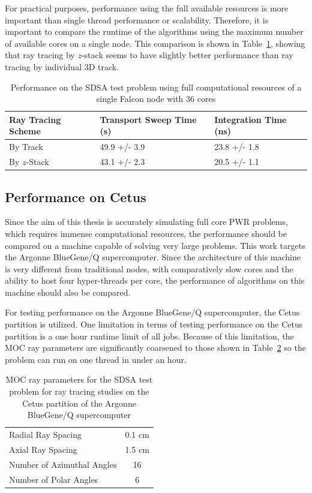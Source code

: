 For practical purposes, performance using the full available resources is more important than single thread performance or scalability. Therefore, it is important to compare the runtime of the algorithms using the maximum number of available cores on a single node. This comparison is shown in Table~\ref{tab:rt-full-thread}, showing that ray tracing by $z$-stack seems to have slightly better performance than ray tracing by individual 3D track.

\begin{table}[ht]
	\centering
	\caption{Performance on the SDSA test problem using full computational resources of a single Falcon node with 36 cores}
	\medskip
	\begin{tabular}{l|l|l}
		\hline
		Ray Tracing Scheme & Transport Sweep Time (s) & Integration Time (ns) \\
		\hline
		By Track & 49.9 +/- 3.9 & 23.8 +/- 1.8 \\
		By $z$-Stack & 43.1 +/- 2.3 & 20.5 +/- 1.1 \\
		\hline
	\end{tabular}
	\label{tab:rt-full-thread}
\end{table}

\subsection{Performance on Cetus}

Since the aim of this thesis is accurately simulating full core PWR problems, which requires immense computational resources, the performance should be compared on a machine capable of solving very large problems. This work targets the Argonne BlueGene/Q supercomputer. Since the architecture of this machine is very different from traditional nodes, with comparatively slow cores and the ability to host four hyper-threads per core, the performance of algorithms on this machine should also be compared.

For testing performance on the Argonne BlueGene/Q supercomputer, the Cetus partition is utilized. One limitation in terms of testing performance on the Cetus partition is a one hour runtime limit of all jobs. Because of this limitation, the \ac{MOC} ray parameters are significantly coarsened to those shown in Table~\ref{tab:rt-cetus-params} so the problem can run on one thread in under an hour.

\begin{table}[ht]
	\centering
	\caption{MOC ray parameters for the SDSA test problem for ray tracing studies on the Cetus partition of the Argonne BlueGene/Q supercomputer}
	\medskip
	\begin{tabular}{lc}
		\hline
		Radial Ray Spacing & 0.1 cm \\
		Axial Ray Spacing & 1.5 cm \\
		Number of Azimuthal Angles & 16 \\
		Number of Polar Angles & 6 \\
		\hline
	\end{tabular}
	\label{tab:rt-cetus-params}
\end{table}

